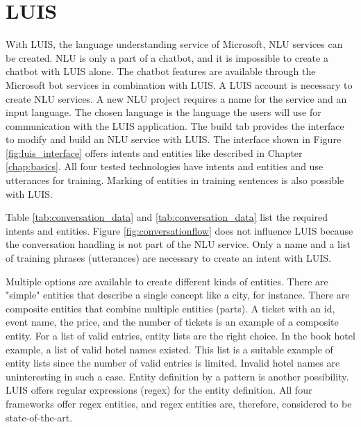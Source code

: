 \section{LUIS}
With LUIS\cite{luisdocs}, the language understanding service of Microsoft, NLU services can be created.
NLU is only a part of a chatbot, and it is impossible to create a chatbot with LUIS alone.
The chatbot features are available through the Microsoft bot services 
in combination with LUIS.
A LUIS account is necessary to create NLU services.
A new NLU project requires a name for the service and an input language.
The chosen language is the language the users will use for communication with the LUIS application.
The build tab provides the interface to modify and build an NLU service with LUIS.
The interface shown in Figure \ref{fig:luis_interface} offers intents and entities like described in Chapter \ref{chap:basics}.
All four tested technologies have intents and entities and use utterances for training.
Marking of entities in training sentences is also possible with LUIS.

Table \ref{tab:conversation_data} and \ref{tab:conversation_data} list the required intents and entities.
Figure \ref{fig:conversationflow} does not influence LUIS because the 
conversation handling is not part of the NLU service.
Only a name and a list of training phrases (utterances) are necessary to create an intent with LUIS.

Multiple options are available to create different kinds of entities.
There are "simple" entities that describe a single concept like a city, for instance.
There are composite entities that combine multiple entities (parts).
A ticket with an id, event name, the price, and the number of tickets is an example of a composite entity.
For a list of valid entries, entity lists are the right choice.
In the book hotel example, a list of valid hotel names existed.
This list is a suitable example of entity lists since the number of valid entries is limited. 
Invalid hotel names are uninteresting in such a case.
Entity definition by a pattern is another possibility.
LUIS offers regular expressions\cite{regex} (regex) for the entity definition.
All four frameworks offer regex entities, and regex entities are, therefore, considered to be state-of-the-art.

